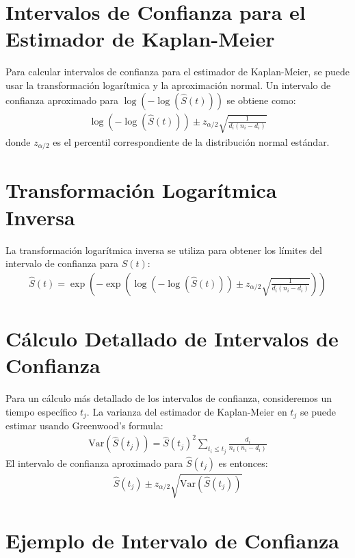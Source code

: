 \documentclass[a4paper]{report} %
\begin{document}
\section*{Intervalos de Confianza para el Estimador de Kaplan-Meier}

Para calcular intervalos de confianza para el estimador de Kaplan-Meier, se puede usar la transformaci\'on logar\'itmica y la aproximaci\'on normal. Un intervalo de confianza aproximado para $\log(-\log(\hat{S}(t)))$ se obtiene como:
\begin{eqnarray*}
\log(-\log(\hat{S}(t))) \pm z_{\alpha/2} \sqrt{\frac{1}{d_i(n_i - d_i)}}
\end{eqnarray*}
donde $z_{\alpha/2}$ es el percentil correspondiente de la distribuci\'on normal est\'andar.

\section*{Transformaci\'on Logar\'itmica Inversa}
La transformaci\'on logar\'itmica inversa se utiliza para obtener los l\'imites del intervalo de confianza para $S(t)$:
\begin{eqnarray*}
\hat{S}(t) = \exp\left(-\exp\left(\log(-\log(\hat{S}(t))) \pm z_{\alpha/2} \sqrt{\frac{1}{d_i(n_i - d_i)}}\right)\right)
\end{eqnarray*}

\section*{C\'alculo Detallado de Intervalos de Confianza}

Para un c\'alculo m\'as detallado de los intervalos de confianza, consideremos un tiempo espec\'ifico $t_j$. La varianza del estimador de Kaplan-Meier en $t_j$ se puede estimar usando Greenwood's formula:
\begin{eqnarray*}
\text{Var}(\hat{S}(t_j)) = \hat{S}(t_j)^2 \sum_{t_i \leq t_j} \frac{d_i}{n_i(n_i - d_i)}
\end{eqnarray*}
El intervalo de confianza aproximado para $\hat{S}(t_j)$ es entonces:
\begin{eqnarray*}
\hat{S}(t_j) \pm z_{\alpha/2} \sqrt{\text{Var}(\hat{S}(t_j))}
\end{eqnarray*}

\section*{Ejemplo de Intervalo de Confianza}
\end{document}
